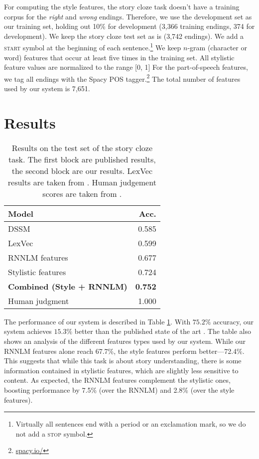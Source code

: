\documentclass[11pt]{article}
\newcommand{\nascomment}[1]{\textcolor{blue}{[\textsc{#1 --nas}]}}
\newcommand{\resolved}[1]{}
\begin{document}
For computing the style features, the story cloze task doesn't have a training corpus for the {\it right} and {\it wrong} endings.
Therefore, we use the development set as our training set, holding out 10\% for development
(3,366 training endings, 374 for development). We keep the story cloze test set as is (3,742 endings).
We add a \textsc{start} symbol at the beginning
of each sentence.\footnote{Virtually all sentences end with a period
  or an exclamation mark, so we do not add a \textsc{stop} symbol.} 
 We keep $n$-gram (character or word) features that occur at least five times in the training set.
All stylistic feature values are normalized to the range [0, 1] \resolved{\nascomment{the
  range [0, 1] or the two values \{0, 1\}?}}
For the part-of-speech features, we tag all endings with the Spacy POS tagger.\footnote{\url{spacy.io/}}
The total number of features used by our system is 7,651.


\section{Results}

\begin{table}%
\begin{center}
\begin{tabular}{|l|r|} \hline
{\bf Model} & {\bf Acc.} \\ \hline
{DSSM} \cite{Mostafazadeh:2016} & 0.585 \\ 
{LexVec} \cite{Salle:2016} & 0.599 \\ \hline\hline
{RNNLM features}		& 0.677 \\ 
{Stylistic features} & {0.724} \\ 
{\bf Combined (Style + RNNLM)} & {\bf 0.752} \\ \hline\hline
Human judgment & 1.000 \\ \hline
\end{tabular}
\end{center}
\caption{\label{cloze_results}
Results on the test set of the  story cloze task. 
The first block are published results, the second block are our results.
LexVec results are taken from \cite{Speer:2016}.
Human judgement scores are taken from \cite{Mostafazadeh:2016}. 
}
\end{table}

The performance of our system is described in Table \ref{cloze_results}. 
With $75.2\%$ accuracy, our system achieves $15.3\%$ better than the published state of the art \cite{Salle:2016}. 
The table also shows an analysis of the different features types used by our system.
While our RNNLM features alone reach 67.7\%, the style features perform better---72.4\%. 
This suggests that while this task is about story understanding, 
there is some information contained in stylistic features, which are slightly less sensitive to content.
As expected, the RNNLM features complement the stylistic ones, boosting performance by 7.5\% (over the RNNLM) and 2.8\% (over the style features). 
\end{document}
